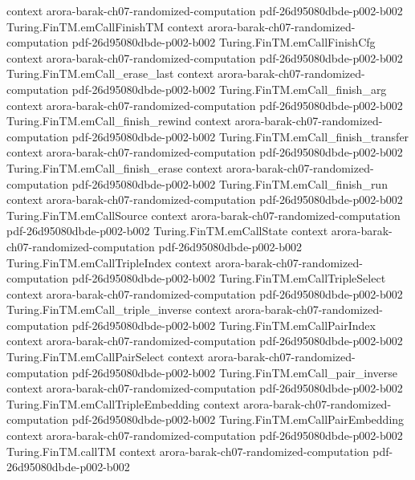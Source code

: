 \begin{theorem}
  {context}
  {arora-barak-ch07-randomized-computation}
  {pdf-26d95080dbde-p002-b002}
\proofstep
  {Turing.FinTM.emCallFinishTM}
  {context}
  {arora-barak-ch07-randomized-computation}
  {pdf-26d95080dbde-p002-b002}
\proofstep
  {Turing.FinTM.emCallFinishCfg}
  {context}
  {arora-barak-ch07-randomized-computation}
  {pdf-26d95080dbde-p002-b002}
\proofstep
  {Turing.FinTM.emCall_erase_last}
  {context}
  {arora-barak-ch07-randomized-computation}
  {pdf-26d95080dbde-p002-b002}
\proofstep
  {Turing.FinTM.emCall_finish_arg}
  {context}
  {arora-barak-ch07-randomized-computation}
  {pdf-26d95080dbde-p002-b002}
\proofstep
  {Turing.FinTM.emCall_finish_rewind}
  {context}
  {arora-barak-ch07-randomized-computation}
  {pdf-26d95080dbde-p002-b002}
\proofstep
  {Turing.FinTM.emCall_finish_transfer}
  {context}
  {arora-barak-ch07-randomized-computation}
  {pdf-26d95080dbde-p002-b002}
\proofstep
  {Turing.FinTM.emCall_finish_erase}
  {context}
  {arora-barak-ch07-randomized-computation}
  {pdf-26d95080dbde-p002-b002}
\proofstep
  {Turing.FinTM.emCall_finish_run}
  {context}
  {arora-barak-ch07-randomized-computation}
  {pdf-26d95080dbde-p002-b002}
\proofstep
  {Turing.FinTM.emCallSource}
  {context}
  {arora-barak-ch07-randomized-computation}
  {pdf-26d95080dbde-p002-b002}
\proofstep
  {Turing.FinTM.emCallState}
  {context}
  {arora-barak-ch07-randomized-computation}
  {pdf-26d95080dbde-p002-b002}
\proofstep
  {Turing.FinTM.emCallTripleIndex}
  {context}
  {arora-barak-ch07-randomized-computation}
  {pdf-26d95080dbde-p002-b002}
\proofstep
  {Turing.FinTM.emCallTripleSelect}
  {context}
  {arora-barak-ch07-randomized-computation}
  {pdf-26d95080dbde-p002-b002}
\proofstep
  {Turing.FinTM.emCall_triple_inverse}
  {context}
  {arora-barak-ch07-randomized-computation}
  {pdf-26d95080dbde-p002-b002}
\proofstep
  {Turing.FinTM.emCallPairIndex}
  {context}
  {arora-barak-ch07-randomized-computation}
  {pdf-26d95080dbde-p002-b002}
\proofstep
  {Turing.FinTM.emCallPairSelect}
  {context}
  {arora-barak-ch07-randomized-computation}
  {pdf-26d95080dbde-p002-b002}
\proofstep
  {Turing.FinTM.emCall_pair_inverse}
  {context}
  {arora-barak-ch07-randomized-computation}
  {pdf-26d95080dbde-p002-b002}
\proofstep
  {Turing.FinTM.emCallTripleEmbedding}
  {context}
  {arora-barak-ch07-randomized-computation}
  {pdf-26d95080dbde-p002-b002}
\proofstep
  {Turing.FinTM.emCallPairEmbedding}
  {context}
  {arora-barak-ch07-randomized-computation}
  {pdf-26d95080dbde-p002-b002}
\proofstep
  {Turing.FinTM.callTM}
  {context}
  {arora-barak-ch07-randomized-computation}
  {pdf-26d95080dbde-p002-b002}

\end{theorem}
